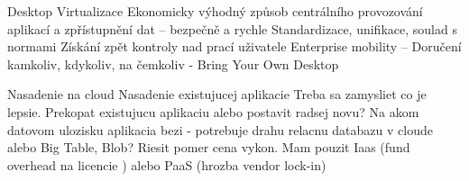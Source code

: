 Desktop Virtualizace
Ekonomicky výhodný způsob centrálního provozování aplikací a zpřístupnění dat – bezpečně a rychle
Standardizace, unifikace, soulad s normami
Získání zpět kontroly nad prací uživatele
Enterprise mobility – Doručení kamkoliv, kdykoliv, na čemkoliv - Bring Your Own Desktop

Nasadenie na cloud
Nasadenie existujucej aplikacie
	Treba sa zamysliet co je lepsie. Prekopat existujucu aplikaciu alebo postavit radsej novu? Na akom datovom ulozisku aplikacia bezi - potrebuje drahu relacnu databazu v cloude alebo Big Table, Blob? Riesit pomer cena vykon. Mam pouzit Iaas  (fund overhead na licencie ) alebo PaaS (hrozba vendor lock-in)

